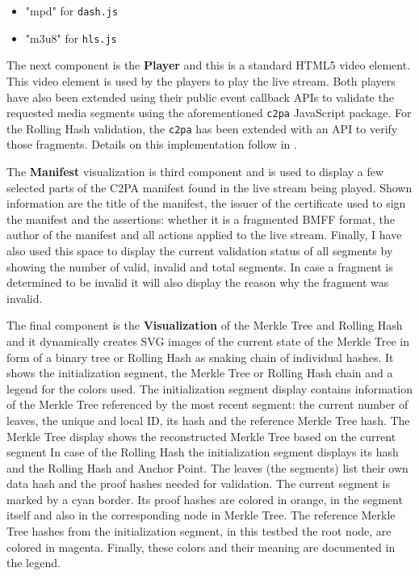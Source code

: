 \begin{itemize}
    \item "mpd" for \texttt{dash.js}
    \item "m3u8" for \texttt{hls.js}
\end{itemize}

The next component is the \textbf{Player} and this is a standard HTML5 video element. This video element is used by the players to play the live stream. Both players have also been extended using their public event callback APIs to validate the requested media segments using the aforementioned \texttt{c2pa} JavaScript package. For the Rolling Hash validation, the \texttt{c2pa} has been extended with an API to verify those fragments. Details on this implementation follow in .

The \textbf{Manifest} visualization is third component and is used to display a few selected parts of the C2PA manifest found in the live stream being played. Shown information are the title of the manifest, the issuer of the certificate used to sign the manifest and the assertions: whether it is a fragmented BMFF format, the author of the manifest and all actions applied to the live stream. Finally, I have also used this space to display the current validation status of all segments by showing the number of valid, invalid and total segments. In case a fragment is determined to be invalid it will also display the reason why the fragment was invalid.

The final component is the \textbf{Visualization} of the Merkle Tree and Rolling Hash and it dynamically creates SVG images of the current state of the Merkle Tree in form of a binary tree or Rolling Hash as snaking chain of individual hashes. It shows the initialization segment, the Merkle Tree or Rolling Hash chain and a legend for the colors used. The initialization segment display contains information of the Merkle Tree referenced by the most recent segment: the current number of leaves, the unique and local ID, its hash and the reference Merkle Tree hash. The Merkle Tree display shows the reconstructed Merkle Tree based on the current segment In case of the Rolling Hash the initialization segment displays its hash and the Rolling Hash and Anchor Point. The leaves (the segments) list their own data hash and the proof hashes needed for validation. The current segment is marked by a cyan border. Its proof hashes are colored in orange, in the segment itself and also in the corresponding node in Merkle Tree. The reference Merkle Tree hashes from the initialization segment, in this testbed the root node, are colored in magenta. Finally, these colors and their meaning are documented in the legend.
